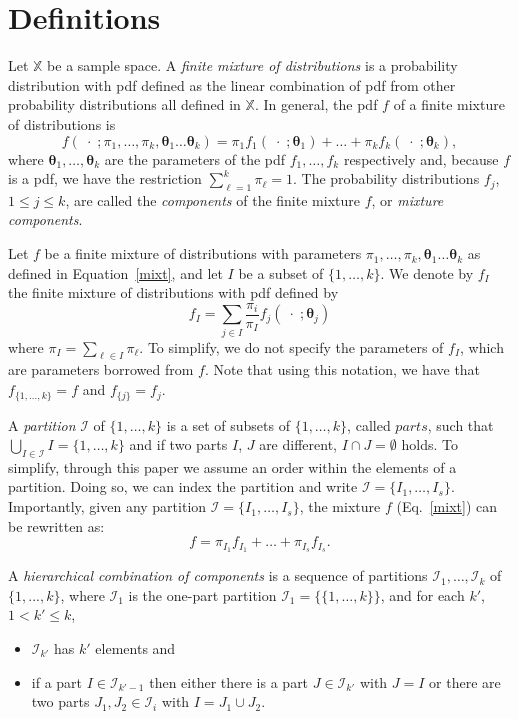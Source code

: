 \documentclass[10pt, a4paper]{article}
\newcommand{\m}[1]{\boldsymbol{#1}}
\begin{document}
\section{Definitions}
\label{definitions}

Let $\mathbb{X}$ be a sample space. A \emph{finite mixture of distributions} is a probability distribution with pdf defined as the linear combination of pdf from other probability distributions all defined in $\mathbb{X}$. In general, the pdf $f$ of a finite mixture of distributions is
\begin{equation}\label{mixt}
f(\;\cdot\; ; \pi_1, \dots, \pi_k, \m\theta_1 \dots \m\theta_k) = \pi_1 f_1(\;\cdot\; ; \m\theta_1) + \dots + \pi_k f_k(\;\cdot\; ; \m\theta_k),
\end{equation}
where $\m\theta_1, \dots,  \m\theta_k$ are the parameters of the pdf $f_1, \dots, f_k$ respectively and, because $f$ is a pdf, we have the restriction $\sum_{\ell = 1}^k \pi_\ell = 1$. The probability distributions $f_j$, $1 \leq j \leq k$, are called the \emph{components} of the finite mixture $f$, or \emph{mixture components}.

Let $f$ be a finite mixture of distributions with  parameters  $\pi_1, \dots, \pi_k, \m\theta_1 \dots \m\theta_k$ as defined in Equation~\ref{mixt}, and let $I$  be a subset of $\{1, \dots, k\}$. We denote by $f_I$ the finite mixture of distributions with pdf defined by
\[
f_I = \sum_{j \in I} \frac{\pi_i}{\pi_I} f_j(\;\cdot\; ; \m\theta_j)
\]
where $\pi_I = \sum_{\ell \in I} \pi_\ell$. To simplify, we do not specify the parameters of $f_I$, which are parameters borrowed from $f$. Note that using this notation, we have that $f_{\{1, \dots, k\}} = f$ and $f_{\{j\}} = f_j$.

A \emph{partition} $\mathcal{I}$ of $\{1, \dots, k\}$ is a set of subsets of $\{1, \dots, k\}$, called $parts$, such that $\bigcup_{I \in \mathcal{I}} I = \{1, \dots, k\}$ and  if two parts $I$, $J$ are different, $I \cap J = \emptyset$ holds. To simplify, through this paper we assume an order within the elements of a partition. Doing so, we can index the partition and write $\mathcal{I} = \{ I_1, \dots, I_s\}$. Importantly, given any partition $\mathcal{I} = \{ I_1, \dots, I_s\}$, the mixture $f$ (Eq.~\ref{mixt}) can be rewritten as:
\[
f = \pi_{I_1} f_{I_1} + \dots + \pi_{I_s} f_{I_s}.
\]


A \emph{hierarchical combination of components} is a sequence of partitions $\mathcal{I}_1, \dots, \mathcal{I}_k$ of $\{1,...,k\}$, where $\mathcal{I}_1$ is the one-part partition $\mathcal{I}_1 = \{ \{1, \dots, k\} \}$, and for each $k'$, $1 <  k' \leq k$,
\begin{itemize}
\item $\mathcal{I}_{k'}$ has $k'$ elements  and
\item if a part $I \in \mathcal{I}_{k'-1}$ then either there is a part $J \in \mathcal{I}_{k'}$ with $J = I$ or there are two parts $J_1, J_2 \in \mathcal{I}_i$ with $I = J_1 \cup J_2$.
\end{itemize}
\end{document}
